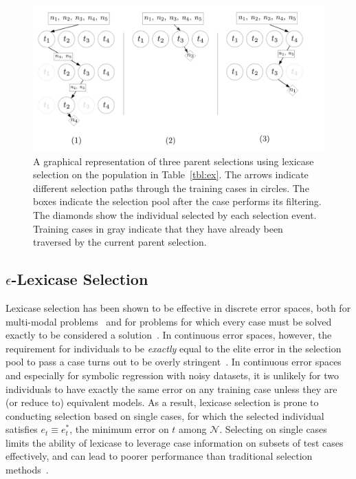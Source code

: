 \documentclass[twoside]{article}
\begin{document}
\begin{figure}[tb]
\centering
  \includegraphics[height = 0.3\textheight]{figs/lex_graph_v3.pdf}
  \caption{A graphical representation of three parent selections using lexicase selection on the population in Table~\ref{tbl:ex}. The arrows indicate different selection paths through the training cases in circles. The boxes indicate the selection pool after the case performs its filtering. The diamonds show the individual selected by each selection event. Training cases in gray indicate that they have already been traversed by the current parent selection.}\label{fig:lex_graph}
\end{figure}

\subsection{{\large $\epsilon$}-Lexicase Selection}\label{s:eplex}

Lexicase selection has been shown to be effective in discrete error spaces, both for multi-modal problems~\citep{spector_assessment_2012} and for problems for which every case must be solved exactly to be considered a solution~\citep{helmuth_solving_2014, helmuth_general_2015-1}. In continuous error spaces, however, the requirement for individuals to be {\it exactly} equal to the elite error in the selection pool to pass a case turns out to be overly stringent~\citep{la_cava_epsilon-lexicase_2016}. In continuous error spaces and especially for symbolic regression with noisy datasets, it is unlikely for two individuals to have exactly the same error on any training case unless they are (or reduce to) equivalent models. As a result, lexicase selection is prone to conducting selection based on single cases, for which the selected individual satisfies $e_t \equiv e^*_t$, the minimum error on $t$ among $\mathcal{N}$. Selecting on single cases limits the ability of lexicase to leverage case information on subsets of test cases effectively, and can lead to poorer performance than traditional selection methods~\citep{la_cava_epsilon-lexicase_2016}. 
\end{document}
